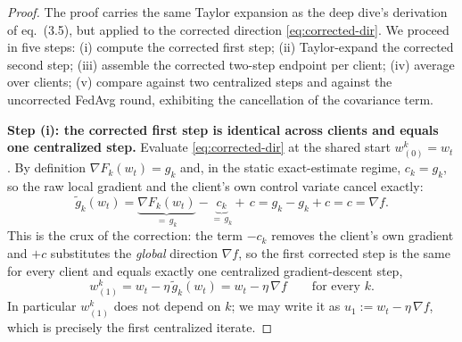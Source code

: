 \documentclass[11pt]{article}
\theoremstyle{definition}
\theoremstyle{remark}
\begin{document}
\begin{proof}
The proof carries the same Taylor expansion as the deep dive's derivation of eq.~(3.5), but
applied to the corrected direction \eqref{eq:corrected-dir}. We proceed in five steps: (i)
compute the corrected first step; (ii) Taylor-expand the corrected second step; (iii) assemble
the corrected two-step endpoint per client; (iv) average over clients; (v) compare against two
centralized steps and against the uncorrected FedAvg round, exhibiting the cancellation of the
covariance term.

\medskip
\noindent\textbf{Step (i): the corrected first step is identical across clients and equals one
centralized step.}
Evaluate \eqref{eq:corrected-dir} at the shared start $w^{k}_{(0)}=w_t$. By definition
$\nabla F_k(w_t)=g_k$ and, in the static exact-estimate regime, $c_k=g_k$, so the raw local
gradient and the client's own control variate cancel exactly:
\begin{equation}
  \tilde g_k(w_t)=\underbrace{\nabla F_k(w_t)}_{=\,g_k}-\underbrace{c_k}_{=\,g_k}+\,c
  = g_k-g_k+c = c = \nabla f.
  \label{eq:first-dir}
\end{equation}
This is the crux of the correction: the term $-c_k$ removes the client's own gradient and
$+c$ substitutes the \emph{global} direction $\nabla f$, so the first corrected step is the
same for every client and equals exactly one centralized gradient-descent step,
\begin{equation}
  w^{k}_{(1)}=w_t-\eta\,\tilde g_k(w_t)=w_t-\eta\,\nabla f
  \qquad\text{for every }k.
  \label{eq:w1}
\end{equation}
In particular $w^{k}_{(1)}$ does not depend on $k$; we may write it as $u_1:=w_t-\eta\,\nabla
f$, which is precisely the first centralized iterate.


\end{proof}
\end{document}
